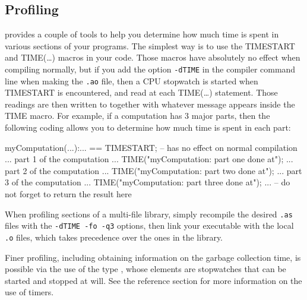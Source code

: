 \subsection{Profiling}
\libaldor{} provides a couple of tools to help you determine how much time is
spent in various sections of your programs. The simplest way is to use
the TIMESTART and TIME(\dots) macros in your code. Those macros have
absolutely no effect when compiling normally, but if you add the option
{\tt -dTIME} in the compiler command line when making the {\tt .ao}
file, then a CPU stopwatch is started when TIMESTART is encountered,
and read at each TIME(\dots) statement. Those readings are then written
to  together with whatever message appears inside
the TIME macro. For example, if a computation has 3 major parts, then the
following coding allows you to determine how much time is spent in each
part:
\begin{ttyout}
myComputation(...):... == {
    TIMESTART;                  -- has no effect on normal compilation
    ... part 1 of the computation ...
    TIME("myComputation: part one done at");
    ... part 2 of the computation ...
    TIME("myComputation: part two done at");
    ... part 3 of the computation ...
    TIME("myComputation: part three done at");
    ...                         -- do not forget to return the result here
}
\end{ttyout}
When profiling sections of a multi-file library, simply recompile the
desired {\tt .as} files with the {\tt -dTIME -fo -q3} options, then link
your executable with the local {\tt .o} files, which takes precedence over
the ones in the library.

Finer profiling, including obtaining information on the garbage collection
time, is possible via the use of the type , whose
elements are stopwatches that can be started and stopped at will. See the
reference section for more information on the use of timers.

